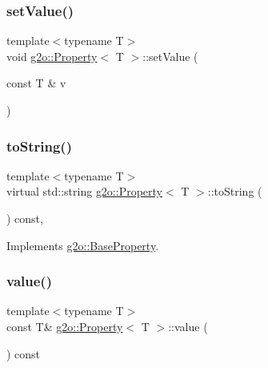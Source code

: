\mbox{\label{classg2o_1_1_property_a438d1ca338ce8c3a371654023200068d}} 
\subsubsection{\texorpdfstring{set\+Value()}{setValue()}}
{\footnotesize\ttfamily template$<$typename T$>$ \\
void \mbox{\hyperlink{classg2o_1_1_property}{g2o\+::\+Property}}$<$ T $>$\+::set\+Value (\begin{DoxyParamCaption}\item[{const T \&}]{v }\end{DoxyParamCaption})\hspace{0.3cm}{\ttfamily [inline]}}

\mbox{\label{classg2o_1_1_property_a8e3d3f2f79d274384588a1a5b9198cf5}} 
\subsubsection{\texorpdfstring{to\+String()}{toString()}}
{\footnotesize\ttfamily template$<$typename T$>$ \\
virtual std\+::string \mbox{\hyperlink{classg2o_1_1_property}{g2o\+::\+Property}}$<$ T $>$\+::to\+String (\begin{DoxyParamCaption}{ }\end{DoxyParamCaption}) const\hspace{0.3cm}{\ttfamily [inline]}, {\ttfamily [virtual]}}



Implements \mbox{\hyperlink{classg2o_1_1_base_property_a7a4191088468c2f03dab52107d130833}{g2o\+::\+Base\+Property}}.

\mbox{\label{classg2o_1_1_property_a76f706f786f6f1ed351f0629b3bbd382}} 
\subsubsection{\texorpdfstring{value()}{value()}}
{\footnotesize\ttfamily template$<$typename T$>$ \\
const T\& \mbox{\hyperlink{classg2o_1_1_property}{g2o\+::\+Property}}$<$ T $>$\+::value (\begin{DoxyParamCaption}{ }\end{DoxyParamCaption}) const\hspace{0.3cm}{\ttfamily [inline]}}



